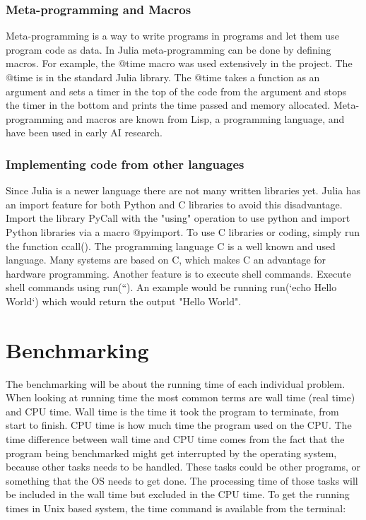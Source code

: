 \documentclass[a4paper,11pt]{article}
\begin{document}
\subsubsection{Meta-programming and Macros}
Meta-programming is a way to write programs in programs and let them use program code as data. In Julia meta-programming can be done by defining macros. For example, the @time macro was used extensively in the project. The @time is in the standard Julia library. The @time takes a function as an argument and sets a timer in the top of the code from the argument and stops the timer in the bottom and prints the time passed and memory allocated. Meta-programming and macros are known from Lisp, a programming language, and have been used in early AI research. 

\subsubsection{Implementing code from other languages}
Since Julia is a newer language there are not many written libraries yet. Julia has an import feature for both Python and C libraries to avoid this disadvantage. Import the library PyCall with the "using" operation to use python and import Python libraries via a macro @pyimport. To use C libraries or coding, simply run the function ccall(). The programming language C is a well known and used language. Many systems are based on C, which makes C an advantage for hardware programming. Another feature is to execute shell commands. Execute shell commands using run(``). An example would be running run(`echo Hello World`) which would return the output "Hello World".

\section{Benchmarking}
The benchmarking will be about the running time of each individual problem. When looking at running time the most common terms are wall time (real time) and CPU time. Wall time is the time it took the program to terminate, from start to finish. CPU time is how much time the program used on the CPU. The time difference between wall time and CPU time comes from the fact that the program being benchmarked might get interrupted by the operating system, because other tasks needs to be handled. These tasks could be other programs, or something that the OS needs to get done. The processing time of those tasks will be included in the wall time but excluded in the CPU time. To get the running times in Unix based system, the time command is available from the terminal:
\end{document}
